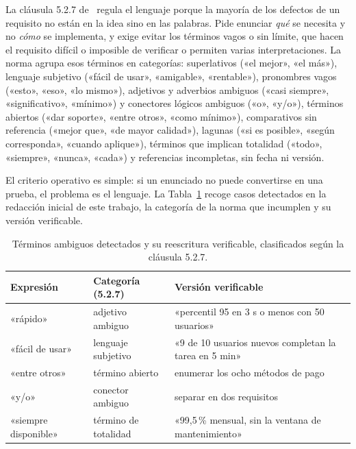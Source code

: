 \documentclass[11pt,a4paper]{article}
\begin{document}
La cláusula 5.2.7 de~\cite{iso29148} regula el lenguaje porque la mayoría de
los defectos de un requisito no están en la idea sino en las palabras. Pide
enunciar \emph{qué} se necesita y no \emph{cómo} se implementa, y exige
evitar los términos vagos o sin límite, que hacen el requisito difícil o
imposible de verificar o permiten varias interpretaciones. La norma agrupa
esos términos en categorías: superlativos («el mejor», «el más»), lenguaje
subjetivo («fácil de usar», «amigable», «rentable»), pronombres vagos
(«esto», «eso», «lo mismo»), adjetivos y adverbios ambiguos («casi
siempre», «significativo», «mínimo») y conectores lógicos ambiguos («o»,
«y/o»), términos abiertos («dar soporte», «entre otros», «como mínimo»),
comparativos sin referencia («mejor que», «de mayor calidad»), lagunas («si
es posible», «según corresponda», «cuando aplique»), términos que implican
totalidad («todo», «siempre», «nunca», «cada») y referencias incompletas,
sin fecha ni versión.

El criterio operativo es simple: si un enunciado no puede convertirse en una
prueba, el problema es el lenguaje. La Tabla~\ref{tab:lenguaje} recoge casos
detectados en la redacción inicial de este trabajo, la categoría de la norma
que incumplen y su versión verificable.

\begin{table}[htbp]
\centering
\caption{Términos ambiguos detectados y su reescritura verificable,
clasificados según la cláusula 5.2.7.}
\label{tab:lenguaje}
\small
\begin{tabularx}{\linewidth}{>{\raggedright\arraybackslash}p{2.6cm}
                              >{\raggedright\arraybackslash}p{3.5cm}
                              >{\raggedright\arraybackslash}X}
\toprule
\textbf{Expresión} & \textbf{Categoría (5.2.7)} & \textbf{Versión verificable} \\
\midrule
«rápido» & adjetivo ambiguo & «percentil 95 en 3 s o menos con 50 usuarios» \\
«fácil de usar» & lenguaje subjetivo & «9 de 10 usuarios nuevos completan la tarea en 5 min» \\
«entre otros» & término abierto & enumerar los ocho métodos de pago \\
«y/o» & conector ambiguo & separar en dos requisitos \\
«siempre disponible» & término de totalidad & «99,5\,\% mensual, sin la ventana de mantenimiento» \\
\bottomrule
\end{tabularx}
\end{table}
\end{document}
